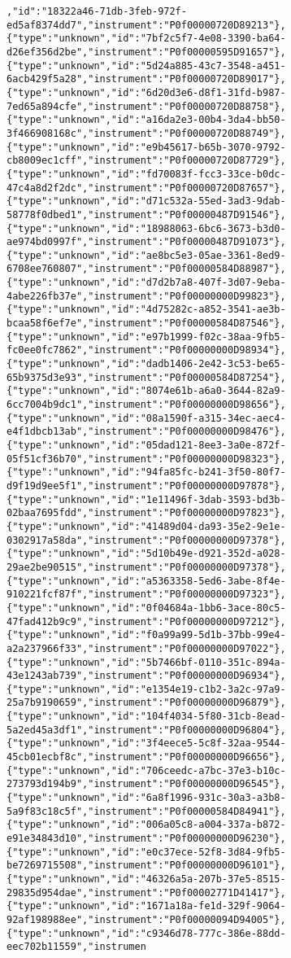\begin{verbatim}
,"id":"18322a46-71db-3feb-972f-ed5af8374dd7","instrument":"P0f00000720D89213"},{"type":"unknown","id":"7bf2c5f7-4e08-3390-ba64-d26ef356d2be","instrument":"P0f00000595D91657"},{"type":"unknown","id":"5d24a885-43c7-3548-a451-6acb429f5a28","instrument":"P0f00000720D89017"},{"type":"unknown","id":"6d20d3e6-d8f1-31fd-b987-7ed65a894cfe","instrument":"P0f00000720D88758"},{"type":"unknown","id":"a16da2e3-00b4-3da4-bb50-3f466908168c","instrument":"P0f00000720D88749"},{"type":"unknown","id":"e9b45617-b65b-3070-9792-cb8009ec1cff","instrument":"P0f00000720D87729"},{"type":"unknown","id":"fd70083f-fcc3-33ce-b0dc-47c4a8d2f2dc","instrument":"P0f00000720D87657"},{"type":"unknown","id":"d71c532a-55ed-3ad3-9dab-58778f0dbed1","instrument":"P0f00000487D91546"},{"type":"unknown","id":"18988063-6bc6-3673-b3d0-ae974bd0997f","instrument":"P0f00000487D91073"},{"type":"unknown","id":"ae8bc5e3-05ae-3361-8ed9-6708ee760807","instrument":"P0f00000584D88987"},{"type":"unknown","id":"d7d2b7a8-407f-3d07-9eba-4abe226fb37e","instrument":"P0f00000000D99823"},{"type":"unknown","id":"4d75282c-a852-3541-ae3b-bcaa58f6ef7e","instrument":"P0f00000584D87546"},{"type":"unknown","id":"e97b1999-f02c-38aa-9fb5-fc0ee0fc7862","instrument":"P0f00000000D98934"},{"type":"unknown","id":"dadb1406-2e42-3c53-be65-65b9375d3e93","instrument":"P0f00000584D87254"},{"type":"unknown","id":"8074e61b-a6a0-3644-82a9-6cc7004b9dc1","instrument":"P0f00000000D98656"},{"type":"unknown","id":"08a1590f-a315-34ec-aec4-e4f1dbcb13ab","instrument":"P0f00000000D98476"},{"type":"unknown","id":"05dad121-8ee3-3a0e-872f-05f51cf36b70","instrument":"P0f00000000D98323"},{"type":"unknown","id":"94fa85fc-b241-3f50-80f7-d9f19d9ee5f1","instrument":"P0f00000000D97878"},{"type":"unknown","id":"1e11496f-3dab-3593-bd3b-02baa7695fdd","instrument":"P0f00000000D97823"},{"type":"unknown","id":"41489d04-da93-35e2-9e1e-0302917a58da","instrument":"P0f00000000D97378"},{"type":"unknown","id":"5d10b49e-d921-352d-a028-29ae2be90515","instrument":"P0f00000000D97378"},{"type":"unknown","id":"a5363358-5ed6-3abe-8f4e-910221fcf87f","instrument":"P0f00000000D97323"},{"type":"unknown","id":"0f04684a-1bb6-3ace-80c5-47fad412b9c9","instrument":"P0f00000000D97212"},{"type":"unknown","id":"f0a99a99-5d1b-37bb-99e4-a2a237966f33","instrument":"P0f00000000D97022"},{"type":"unknown","id":"5b7466bf-0110-351c-894a-43e1243ab739","instrument":"P0f00000000D96934"},{"type":"unknown","id":"e1354e19-c1b2-3a2c-97a9-25a7b9190659","instrument":"P0f00000000D96879"},{"type":"unknown","id":"104f4034-5f80-31cb-8ead-5a2ed45a3df1","instrument":"P0f00000000D96804"},{"type":"unknown","id":"3f4eece5-5c8f-32aa-9544-45cb01ecbf8c","instrument":"P0f00000000D96656"},{"type":"unknown","id":"706ceedc-a7bc-37e3-b10c-273793d194b9","instrument":"P0f00000000D96545"},{"type":"unknown","id":"6a8f1996-931c-30a3-a3b8-5a9f83c18c5f","instrument":"P0f00000584D84941"},{"type":"unknown","id":"006a05c8-a004-337a-b872-e91e34843d10","instrument":"P0f00000000D96230"},{"type":"unknown","id":"e0c37ece-52f8-3d84-9fb5-be7269715508","instrument":"P0f00000000D96101"},{"type":"unknown","id":"46326a5a-207b-37e5-8515-29835d954dae","instrument":"P0f00002771D41417"},{"type":"unknown","id":"1671a18a-fe1d-329f-9064-92af198988ee","instrument":"P0f00000094D94005"},{"type":"unknown","id":"c9346d78-777c-386e-88dd-eec702b11559","instrumen
\end{verbatim}
